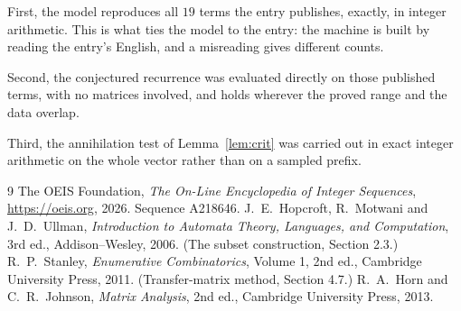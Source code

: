 \documentclass[11pt,a4paper]{article}
\theoremstyle{plain}
\theoremstyle{definition}
\begin{document}
First, the model reproduces all $19$ terms the entry publishes, exactly, in integer
arithmetic. This is what ties the model to the entry: the machine is built by reading the
entry's English, and a misreading gives different counts.

Second, the conjectured recurrence was evaluated directly on those published terms, with no
matrices involved, and holds wherever the proved range and the data overlap.

Third, the annihilation test of Lemma~\ref{lem:crit} was carried out in exact integer
arithmetic on the whole vector rather than on a sampled prefix.

\begin{thebibliography}{9}
 The OEIS Foundation, \emph{The On-Line Encyclopedia of Integer
Sequences}, \url{https://oeis.org}, 2026. Sequence A218646.
 J.~E.~Hopcroft, R.~Motwani and J.~D.~Ullman, \emph{Introduction to Automata
Theory, Languages, and Computation}, 3rd ed., Addison--Wesley, 2006. (The subset
construction, Section 2.3.)
 R.~P.~Stanley, \emph{Enumerative Combinatorics}, Volume 1, 2nd ed.,
Cambridge University Press, 2011. (Transfer-matrix method, Section 4.7.)
 R.~A.~Horn and C.~R.~Johnson, \emph{Matrix Analysis}, 2nd ed., Cambridge
University Press, 2013.
\end{thebibliography}
\end{document}
